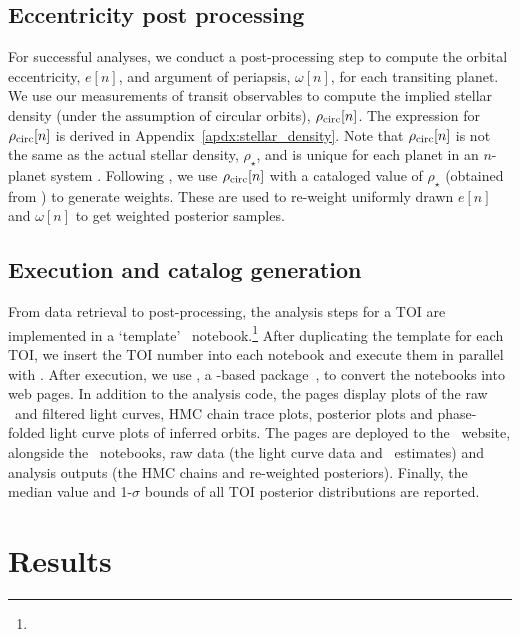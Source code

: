 \documentclass[floatfix,ApJL,twocolumn]{aastex631}
\begin{document}
\subsection{Eccentricity post processing}

For successful analyses, we conduct a post-processing step to compute the orbital eccentricity, $e[n]$, and argument of periapsis, $\omega[n]$, for each transiting planet. 
We use our measurements of transit observables to compute the implied stellar density (under the assumption of circular orbits), $\rho_{\rm circ}[n]$. 
The expression for $\rho_{\rm circ}[n]$ is derived in Appendix~\ref{apdx:stellar_density}.
Note that $\rho_{\rm circ}[n]$ is not the same as the actual stellar density, $\rho_{\star}$, and is unique for each planet in an $n$-planet system \citep[see, for example,][]{Dawson:2012:ApJ, Kipping:2012:MNRAS}. 
Following \citet{Dawson:2012:ApJ}, we use $\rho_{\rm circ}[n]$ with a cataloged value of $\rho_\star$ (obtained from \mast) to generate weights. 
These are used to re-weight uniformly drawn $e[n]$ and $\omega[n]$ to get weighted posterior samples. 

\subsection{Execution and catalog generation}

From data retrieval to post-processing, the analysis steps for a TOI are implemented in a `template' \jupyter\ notebook.\footnote{\toiTemplateLink}
After duplicating the template for each TOI, we insert the TOI number into each notebook and execute them in parallel with \nbconvert. 
After execution, we use \jupyterbook, a \sphinx-based package~\citep{sphinx_doc}, to convert the notebooks into web pages.
In addition to the analysis code, the pages display plots of the raw \mast\ and filtered light curves, HMC chain trace plots, posterior plots and phase-folded light curve plots of inferred orbits.
The pages are deployed to the \tessAtlas\ website, alongside the \jupyter\ notebooks, raw data (the light curve data and \exofop\ estimates) and analysis outputs (the HMC chains and re-weighted posteriors). 
Finally, the median value and 1-$\sigma$ bounds of all TOI posterior distributions are reported. 

\section{Results}\label{sec:results}
\end{document}
